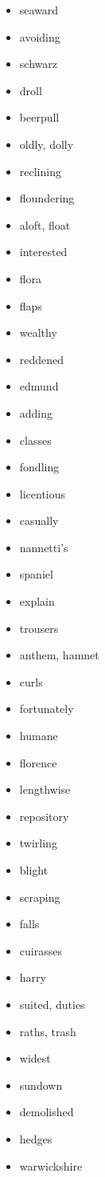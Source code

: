 \documentclass{article}
\begin{document}
\begin{itemize}
    \item seaward
    \item avoiding
    \item schwarz
    \item droll
    \item beerpull
    \item oldly, dolly
    \item reclining
    \item floundering
    \item aloft, float
    \item interested
    \item flora
    \item flaps
    \item wealthy
    \item reddened
    \item edmund
    \item adding
    \item classes
    \item fondling
    \item licentious
    \item casually
    \item nannetti's
    \item spaniel
    \item explain
    \item trousers
    \item anthem, hamnet
    \item curls
    \item fortunately
    \item humane
    \item florence
    \item lengthwise
    \item repository
    \item twirling
    \item blight
    \item scraping
    \item falls
    \item cuirasses
    \item harry
    \item suited, duties
    \item raths, trash
    \item widest
    \item sundown
    \item demolished
    \item hedges
    \item warwickshire

\end{itemize}
\end{document}
